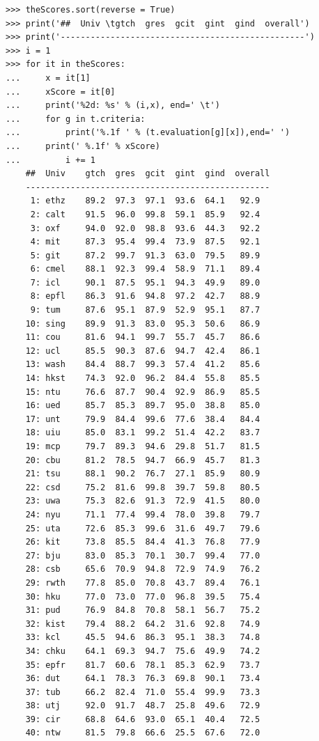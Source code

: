 \begin{lstlisting}[caption={Printing the ranked performance table},label=list:13.5]
>>> theScores.sort(reverse = True)
>>> print('##  Univ \tgtch  gres  gcit  gint  gind  overall')
>>> print('-------------------------------------------------') 
>>> i = 1
>>> for it in theScores:
...     x = it[1]
...     xScore = it[0]
...     print('%2d: %s' % (i,x), end=' \t')
...     for g in t.criteria:
...         print('%.1f ' % (t.evaluation[g][x]),end=' ')
...	    print(' %.1f' % xScore)
...         i += 1   
    ##  Univ 	gtch  gres  gcit  gint  gind  overall
    -------------------------------------------------
     1: ethz 	89.2  97.3  97.1  93.6  64.1   92.9
     2: calt 	91.5  96.0  99.8  59.1  85.9   92.4
     3: oxf 	94.0  92.0  98.8  93.6  44.3   92.2
     4: mit 	87.3  95.4  99.4  73.9  87.5   92.1
     5: git 	87.2  99.7  91.3  63.0  79.5   89.9
     6: cmel 	88.1  92.3  99.4  58.9  71.1   89.4
     7: icl 	90.1  87.5  95.1  94.3  49.9   89.0
     8: epfl 	86.3  91.6  94.8  97.2  42.7   88.9
     9: tum 	87.6  95.1  87.9  52.9  95.1   87.7
    10: sing 	89.9  91.3  83.0  95.3  50.6   86.9
    11: cou 	81.6  94.1  99.7  55.7  45.7   86.6
    12: ucl 	85.5  90.3  87.6  94.7  42.4   86.1
    13: wash 	84.4  88.7  99.3  57.4  41.2   85.6
    14: hkst 	74.3  92.0  96.2  84.4  55.8   85.5
    15: ntu 	76.6  87.7  90.4  92.9  86.9   85.5
    16: ued 	85.7  85.3  89.7  95.0  38.8   85.0
    17: unt 	79.9  84.4  99.6  77.6  38.4   84.4
    18: uiu 	85.0  83.1  99.2  51.4  42.2   83.7
    19: mcp 	79.7  89.3  94.6  29.8  51.7   81.5
    20: cbu 	81.2  78.5  94.7  66.9  45.7   81.3
    21: tsu 	88.1  90.2  76.7  27.1  85.9   80.9
    22: csd 	75.2  81.6  99.8  39.7  59.8   80.5
    23: uwa 	75.3  82.6  91.3  72.9  41.5   80.0
    24: nyu 	71.1  77.4  99.4  78.0  39.8   79.7
    25: uta 	72.6  85.3  99.6  31.6  49.7   79.6
    26: kit 	73.8  85.5  84.4  41.3  76.8   77.9
    27: bju 	83.0  85.3  70.1  30.7  99.4   77.0
    28: csb 	65.6  70.9  94.8  72.9  74.9   76.2
    29: rwth 	77.8  85.0  70.8  43.7  89.4   76.1
    30: hku 	77.0  73.0  77.0  96.8  39.5   75.4
    31: pud 	76.9  84.8  70.8  58.1  56.7   75.2
    32: kist 	79.4  88.2  64.2  31.6  92.8   74.9
    33: kcl 	45.5  94.6  86.3  95.1  38.3   74.8
    34: chku 	64.1  69.3  94.7  75.6  49.9   74.2
    35: epfr 	81.7  60.6  78.1  85.3  62.9   73.7
    36: dut 	64.1  78.3  76.3  69.8  90.1   73.4
    37: tub 	66.2  82.4  71.0  55.4  99.9   73.3
    38: utj 	92.0  91.7  48.7  25.8  49.6   72.9
    39: cir 	68.8  64.6  93.0  65.1  40.4   72.5
    40: ntw 	81.5  79.8  66.6  25.5  67.6   72.0

\end{lstlisting}
